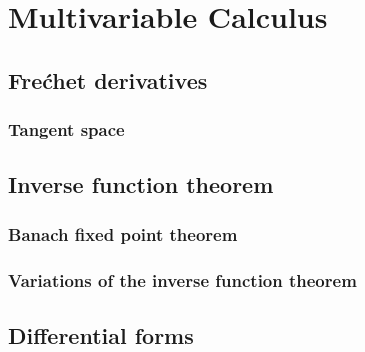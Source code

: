 \documentclass{../note}
\begin{document}
\section{}


\chapter{}





\part{Multivariable Calculus}
\chapter{Fre\'chet derivatives}
\section{Tangent space}



\chapter{Inverse function theorem}
\section{Banach fixed point theorem}
\section{Variations of the inverse function theorem}





\chapter{Differential forms}
\end{document}
